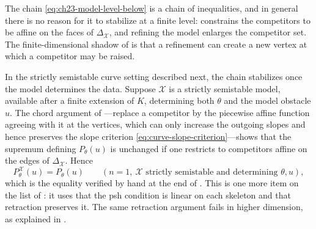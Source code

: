 \begin{remark}
\label{rem:ch23-model-dependence}
The chain \eqref{eq:ch23-model-level-below} is a chain of inequalities, and
in general there is no reason for it to stabilize at a finite level:
 constrains the competitors to be affine
on the faces of $\Delta_{\mathcal X}$, and refining the model enlarges the
competitor set.  The finite-dimensional shadow of
 is that a refinement can create a new vertex
at which a competitor may be raised.

In the strictly semistable curve setting described next, the chain
stabilizes once the model determines the data.  Suppose $\mathcal X$ is a strictly
semistable model, available after a finite extension of $K$, determining
both $\theta$ and the model obstacle $u$.  The chord argument of
\cite[Proposition~3.10]{GJKM19}---replace a competitor by the piecewise
affine function agreeing with it at the vertices, which can only increase
the outgoing slopes and hence preserves the slope criterion
\eqref{eq:curve-slope-criterion}---shows that the supremum defining
$P_\theta(u)$ is unchanged if one restricts to competitors affine on the
edges of $\Delta_{\mathcal X}$.  Hence
\[
 P^{\mathcal X}_\theta(u)=P_\theta(u)
 \qquad(n=1,\ \mathcal X\text{ strictly semistable and determining }
 \theta,u),
\]
which is the equality verified by hand at the end of
.  This is one more item on the list of
: it uses that the psh condition is linear
on each skeleton and that retraction preserves it.  The same retraction
argument fails in higher dimension, as explained in
.
\end{remark}

